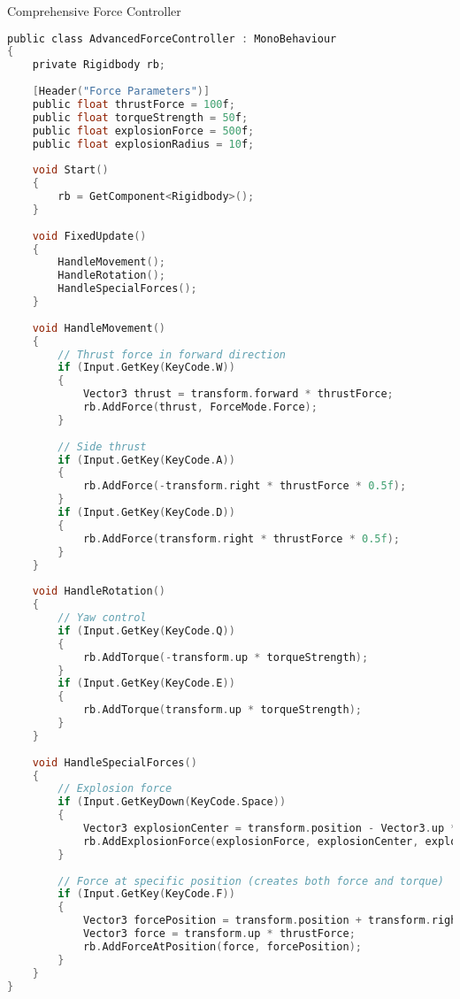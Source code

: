 \begin{code}{Comprehensive Force Controller}\\
\begin{lstlisting}[language=C, style=basesmol]
public class AdvancedForceController : MonoBehaviour 
{
    private Rigidbody rb;
    
    [Header("Force Parameters")]
    public float thrustForce = 100f;
    public float torqueStrength = 50f;
    public float explosionForce = 500f;
    public float explosionRadius = 10f;
    
    void Start() 
    {
        rb = GetComponent<Rigidbody>();
    }
    
    void FixedUpdate() 
    {
        HandleMovement();
        HandleRotation();
        HandleSpecialForces();
    }
    
    void HandleMovement() 
    {
        // Thrust force in forward direction
        if (Input.GetKey(KeyCode.W)) 
        {
            Vector3 thrust = transform.forward * thrustForce;
            rb.AddForce(thrust, ForceMode.Force);
        }
        
        // Side thrust
        if (Input.GetKey(KeyCode.A)) 
        {
            rb.AddForce(-transform.right * thrustForce * 0.5f);
        }
        if (Input.GetKey(KeyCode.D)) 
        {
            rb.AddForce(transform.right * thrustForce * 0.5f);
        }
    }
    
    void HandleRotation() 
    {
        // Yaw control
        if (Input.GetKey(KeyCode.Q)) 
        {
            rb.AddTorque(-transform.up * torqueStrength);
        }
        if (Input.GetKey(KeyCode.E)) 
        {
            rb.AddTorque(transform.up * torqueStrength);
        }
    }
    
    void HandleSpecialForces() 
    {
        // Explosion force
        if (Input.GetKeyDown(KeyCode.Space)) 
        {
            Vector3 explosionCenter = transform.position - Vector3.up * 2f;
            rb.AddExplosionForce(explosionForce, explosionCenter, explosionRadius);
        }
        
        // Force at specific position (creates both force and torque)
        if (Input.GetKey(KeyCode.F)) 
        {
            Vector3 forcePosition = transform.position + transform.right;
            Vector3 force = transform.up * thrustForce;
            rb.AddForceAtPosition(force, forcePosition);
        }
    }
}
\end{lstlisting}
\end{code}

